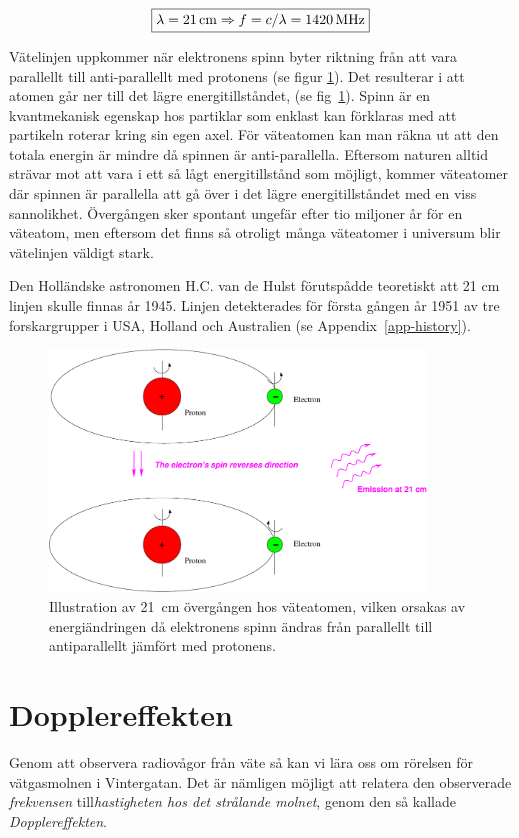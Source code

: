 \begin{equation}
\boxed{
\lambda = 21 \, {\rm cm}
\Rightarrow f=c/\lambda = 1420 \, {\rm MHz}}
\end{equation}

Vätelinjen uppkommer när elektronens spinn byter riktning från att vara
parallellt till anti-parallellt med protonens (se figur \ref{fighyperfin}).
Det resulterar i att atomen går ner till det lägre energitillståndet, (se
fig~\ref{fighyperfin}). Spinn är en kvantmekanisk egenskap hos partiklar som
enklast kan förklaras med att partikeln roterar kring sin egen axel. För
väteatomen kan man räkna ut att den totala energin är mindre då spinnen är
anti-parallella. Eftersom naturen alltid strävar mot att vara i ett så lågt
energitillstånd som möjligt, kommer väteatomer där spinnen är parallella att gå
över i det lägre energitillståndet med en viss sannolikhet. Övergången sker
spontant ungefär efter tio miljoner år för en väteatom, men eftersom det finns
så otroligt många väteatomer i universum blir vätelinjen väldigt stark. 

Den Holländske astronomen H.C. van de Hulst förutspådde teoretiskt att
21 cm linjen skulle finnas år 1945. Linjen detekterades för första
gången år 1951 av tre forskargrupper i USA, Holland och Australien (se
Appendix~\ref{app-history}).

\begin{figure}[ht]
\begin{center}
\includegraphics[width=10cm]{../figures/hyperfine.pdf}
\end{center}
\caption{Illustration av 21~cm övergången hos väteatomen, vilken orsakas
  av energiändringen då elektronens spinn ändras från parallellt till
  antiparallellt jämfört med protonens.}
\label{fighyperfin}
\end{figure}  

\section{Dopplereffekten}
Genom att observera radiovågor från väte så kan vi lära oss om rörelsen
för vätgasmolnen i Vintergatan. Det är nämligen möjligt att relatera den
observerade {\em frekvensen} till{\em hastigheten hos det strålande molnet}, 
genom den så kallade {\em Dopplereffekten}.

